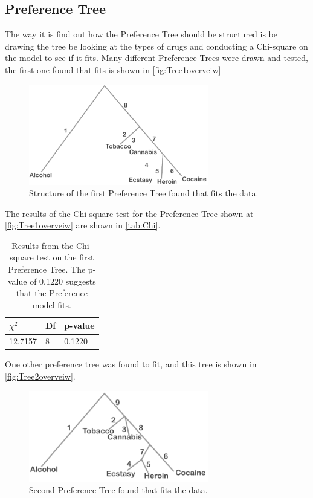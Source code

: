 \subsection*{Preference Tree}
The way it is find out how the Preference Tree should be structured is be drawing the tree be looking at the types of drugs and conducting a Chi-square on the model to see if it fits. Many different Preference Trees were drawn and tested, the first one found that fits is shown in \autoref{fig:Tree1overveiw}
%
\begin{figure}[H]
\centering
\includegraphics[width = 0.70\textwidth]{Figure/Tree1overview}
\caption{Structure of the first Preference Tree found that fits the data.}
\label{fig:Tree1overveiw}
\end{figure}
\noindent
%
The results of the Chi-square test for the Preference Tree shown at \autoref{fig:Tree1overveiw} are shown in \autoref{tab:Chi}. 
%
\begin{table}[H]
\centering
\begin{tabular}{@{}lll@{}}
\toprule
$\chi^{2}$   & Df  & p-value \\ \midrule
12.7157      & 8   & 0.1220  \\ \bottomrule
\end{tabular}
\caption{Results from the Chi-square test on the first Preference Tree. The p-value of 0.1220 suggests that the Preference model fits.}
\label{tab:Chi1}
\end{table} 
\noindent
%
One other preference tree was found to fit, and this tree is shown in \autoref{fig:Tree2overveiw}. 
%
\begin{figure}[H]
\centering
\includegraphics[width = 0.70\textwidth]{Figure/Tree2overview}
\caption{Second Preference Tree found that fits the data.}
\label{fig:Tree2overveiw}
\end{figure}
